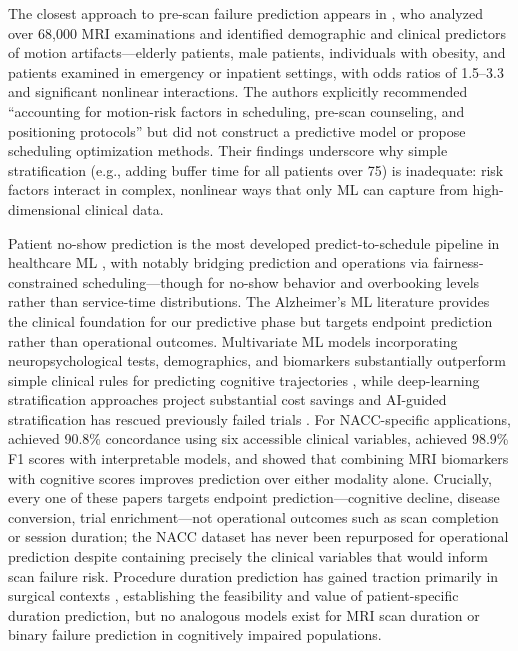 \documentclass[11pt,a4paper]{article}
\begin{document}
The closest approach to pre-scan failure prediction appears in \citet{porembka2025disparities}, who analyzed over 68{,}000 MRI examinations and identified demographic and clinical predictors of motion artifacts---elderly patients, male patients, individuals with obesity, and patients examined in emergency or inpatient settings, with odds ratios of 1.5--3.3 and significant nonlinear interactions. The authors explicitly recommended ``accounting for motion-risk factors in scheduling, pre-scan counseling, and positioning protocols'' but did not construct a predictive model or propose scheduling optimization methods. Their findings underscore why simple stratification (e.g., adding buffer time for all patients over 75) is inadequate: risk factors interact in complex, nonlinear ways that only ML can capture from high-dimensional clinical data.

Patient no-show prediction is the most developed predict-to-schedule pipeline in healthcare ML \citep{dantas2018noshows, asan2022pediatric, silva2023decision}, with \citet{samorani2021overbooked} notably bridging prediction and operations via fairness-constrained scheduling---though for no-show behavior and overbooking levels rather than service-time distributions. The Alzheimer's ML literature provides the clinical foundation for our predictive phase but targets endpoint prediction rather than operational outcomes. Multivariate ML models incorporating neuropsychological tests, demographics, and biomarkers substantially outperform simple clinical rules for predicting cognitive trajectories \citep{tam2022prediction}, while deep-learning stratification approaches project substantial cost savings \citep{birkenbihl2024deep} and AI-guided stratification has rescued previously failed trials \citep{vaghari2025amaranth}. For NACC-specific applications, \citet{song2023random} achieved 90.8\% concordance using six accessible clinical variables, \citet{elsappagh2024explainable} achieved 98.9\% F1 scores with interpretable models, and \citet{coupe2019mri} showed that combining MRI biomarkers with cognitive scores improves prediction over either modality alone. Crucially, every one of these papers targets endpoint prediction---cognitive decline, disease conversion, trial enrichment---not operational outcomes such as scan completion or session duration; the NACC dataset has never been repurposed for operational prediction despite containing precisely the clinical variables that would inform scan failure risk. Procedure duration prediction has gained traction primarily in surgical contexts \citep{bartek2019improving, master2023multicenter, spence2023scoping, martinez2021machine}, establishing the feasibility and value of patient-specific duration prediction, but no analogous models exist for MRI scan duration or binary failure prediction in cognitively impaired populations.
\end{document}
